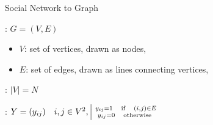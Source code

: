 \begin{frame}[t]{Social Network to Graph}


    \begin{description}[align]
        \item[A graph]: $G = (V,E)$
            \begin{itemize}
                \item $V$: set of vertices, drawn as nodes,
                \item $E$: set of edges, drawn as lines connecting vertices,
            \end{itemize}

        \item[containing $N$ nodes]:  $|V| = N$
        \item[Define a adjacency matrix]:  $Y=(y_{ij}) \quad i,j \in V^2, \left| \substack{\ y_{ij}=1 \quad \textrm{if} \quad (i,j) \in E \\ y_{ij}=0 \quad \textrm{otherwise} } \right.\kern-\nulldelimiterspace  $
    \end{description}


\end{frame}
